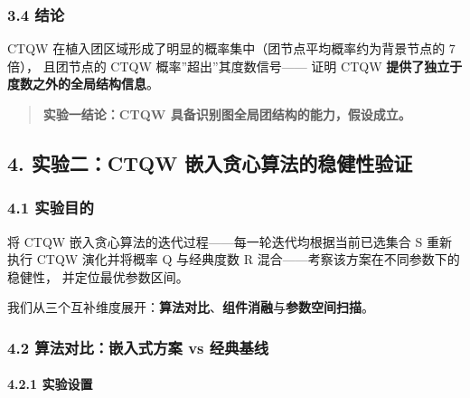 \documentclass[
  11pt,
]{ctexart}
\begin{document}
\subsubsection{3.4 结论}\label{ux7ed3ux8bba}

CTQW 在植入团区域形成了明显的概率集中（团节点平均概率约为背景节点的 7
倍）， 且团节点的 CTQW 概率''超出''其度数信号------ 证明 CTQW
\textbf{提供了独立于度数之外的全局结构信息}。

\begin{quote}
\textbf{实验一结论：CTQW 具备识别图全局团结构的能力，假设成立。}
\end{quote}

\subsection{4. 实验二：CTQW
嵌入贪心算法的稳健性验证}\label{ux5b9eux9a8cux4e8cctqw-ux5d4cux5165ux8d2aux5fc3ux7b97ux6cd5ux7684ux7a33ux5065ux6027ux9a8cux8bc1}

\subsubsection{4.1 实验目的}\label{ux5b9eux9a8cux76eeux7684-1}

将 CTQW 嵌入贪心算法的迭代过程------每一轮迭代均根据当前已选集合 S
重新执行 CTQW 演化并将概率 Q 与经典度数 R
混合------考察该方案在不同参数下的稳健性， 并定位最优参数区间。

我们从三个互补维度展开：\textbf{算法对比}、\textbf{组件消融}与\textbf{参数空间扫描}。

\subsubsection{4.2 算法对比：嵌入式方案 vs
经典基线}\label{ux7b97ux6cd5ux5bf9ux6bd4ux5d4cux5165ux5f0fux65b9ux6848-vs-ux7ecfux5178ux57faux7ebf}

\paragraph{4.2.1 实验设置}\label{ux5b9eux9a8cux8bbeux7f6e-1}
\end{document}
